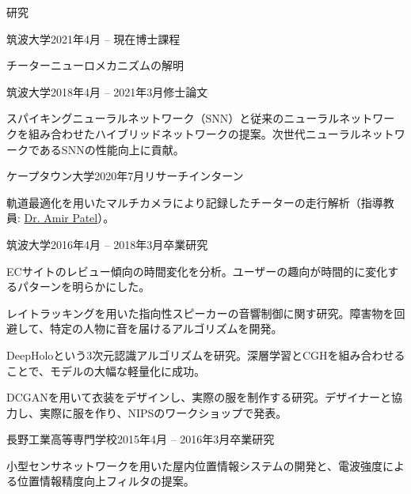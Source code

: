 \documentclass{resume} %
\begin{document}
\begin{rSection}{研究}

    \begin{rSubsection}{筑波大学}{2021年4月 -- 現在}{博士課程}{}
    \item チーターニューロメカニズムの解明
    \end{rSubsection}

    \begin{rSubsection}{筑波大学}{2018年4月 -- 2021年3月}{修士論文}{}
    \item スパイキングニューラルネットワーク（SNN）と従来のニューラルネットワークを組み合わせたハイブリッドネットワークの提案。次世代ニューラルネットワークであるSNNの性能向上に貢献。
    \end{rSubsection}

    \begin{rSubsection}{ケープタウン大学}{2020年7月}{リサーチインターン}{}
    \item 軌道最適化を用いたマルチカメラにより記録したチーターの走行解析（指導教員: \href{https://scholar.google.co.za/citations?user=RxMigV4AAAAJ&view_op=list_works&sortby=pubdate}{Dr. Amir Patel}）。
    \end{rSubsection}

    \begin{rSubsection}{筑波大学}{2016年4月 -- 2018年3月}{卒業研究}{}
    \item ECサイトのレビュー傾向の時間変化を分析。ユーザーの趣向が時間的に変化するパターンを明らかにした。
    \item レイトラッキングを用いた指向性スピーカーの音響制御に関す研究。障害物を回避して、特定の人物に音を届けるアルゴリズムを開発。
    \item DeepHoloという3次元認識アルゴリズムを研究。深層学習とCGHを組み合わせることで、モデルの大幅な軽量化に成功。
    \item DCGANを用いて衣装をデザインし、実際の服を制作する研究。デザイナーと協力し、実際に服を作り、NIPSのワークショップで発表。
    \end{rSubsection}

    \begin{rSubsection}{長野工業高等専門学校}{2015年4月 -- 2016年3月}{卒業研究}{}
    \item 小型センサネットワークを用いた屋内位置情報システムの開発と、電波強度による位置情報精度向上フィルタの提案。
    \end{rSubsection}

\end{rSection}
\end{document}
